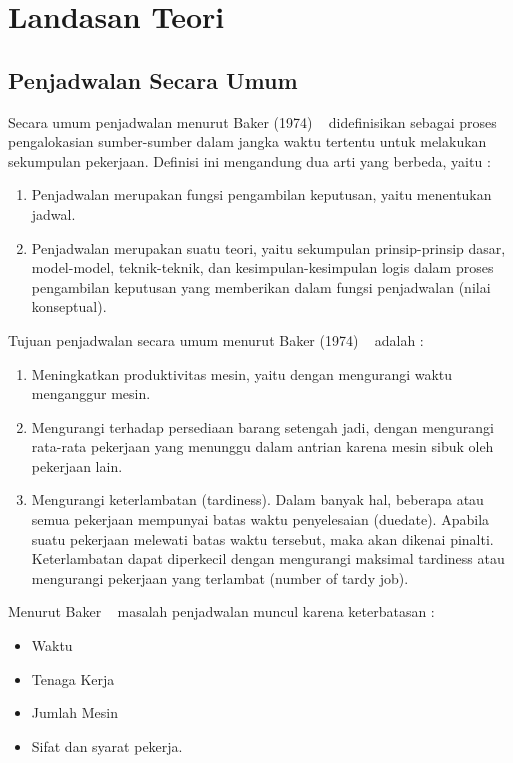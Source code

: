 \chapter{Landasan Teori}
\label{chap:teori}

\section{Penjadwalan Secara Umum}
\label{sec:penjadwalan} 
 Secara umum penjadwalan menurut Baker (1974) ~\cite{barker:74:introduction} didefinisikan sebagai proses pengalokasian sumber-sumber dalam jangka waktu tertentu untuk melakukan sekumpulan pekerjaan. Definisi ini mengandung dua arti yang berbeda, yaitu :
 \begin{enumerate}
 	\item Penjadwalan merupakan fungsi pengambilan keputusan, yaitu menentukan jadwal. 
 	\item Penjadwalan merupakan suatu teori, yaitu sekumpulan prinsip-prinsip dasar, model-model, teknik-teknik, dan kesimpulan-kesimpulan logis dalam proses pengambilan keputusan yang memberikan dalam fungsi penjadwalan (nilai konseptual).
 \end{enumerate}
	Tujuan penjadwalan secara umum menurut Baker (1974) ~\cite{berg:08:compgeom} adalah :
\begin{enumerate}
	\item Meningkatkan produktivitas mesin, yaitu dengan mengurangi waktu menganggur mesin.
	\item Mengurangi terhadap persediaan barang setengah jadi, dengan mengurangi rata-rata pekerjaan yang menunggu dalam antrian karena mesin sibuk oleh pekerjaan lain.
	\item Mengurangi keterlambatan (tardiness). Dalam banyak hal, beberapa atau semua pekerjaan mempunyai batas waktu penyelesaian (duedate). Apabila suatu pekerjaan melewati batas waktu tersebut, maka akan dikenai pinalti. Keterlambatan dapat diperkecil dengan mengurangi maksimal tardiness atau mengurangi pekerjaan yang terlambat (number of  tardy job).
\end{enumerate}
	Menurut Baker ~\cite{baker:1974:introduction} masalah penjadwalan muncul karena keterbatasan :
	\begin{itemize}
		\item Waktu
		\item Tenaga Kerja
		\item Jumlah Mesin
		\item Sifat dan syarat pekerja.
	\end{itemize}

